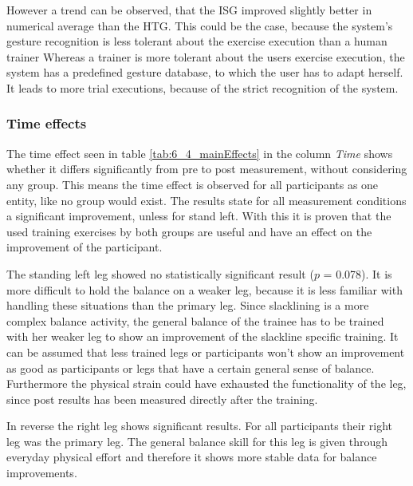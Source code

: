 However a trend can be observed, that the ISG improved slightly better in numerical average than the HTG.
This could be the case, because the system's gesture recognition is less tolerant about the exercise execution than a human trainer
Whereas a trainer is more tolerant about the users exercise execution, the system has a predefined gesture database, to which the user has to adapt herself.
It leads to more trial executions, because of the strict recognition of the system.

\subsubsection{Time effects}
The time effect seen in table \ref{tab:6_4_mainEffects} in the column \textit{Time} shows whether it differs significantly from pre to post measurement, without considering any group.
This means the time effect is observed for all participants as one entity, like no group would exist.
The results state for all measurement conditions a significant improvement, unless for stand left.
With this it is proven that the used training exercises by both groups are useful and have an effect on the improvement of the participant.

The standing left leg showed no statistically significant result ($p$ = 0.078).
It is more difficult to hold the balance on a weaker leg, because it is less familiar with handling these situations than the primary leg.
Since slacklining is a more complex balance activity, the general balance of the trainee has to be trained with her weaker leg to show an improvement of the slackline specific training.
It can be assumed that less trained legs or participants won't show an improvement as good as participants or legs that have a certain general sense of balance.
Furthermore the physical strain could have exhausted the functionality of the leg, since post results has been measured directly after the training.

In reverse the right leg shows significant results.
For all participants their right leg was the primary leg.
The general balance skill for this leg is given through everyday physical effort and therefore it shows more stable data for balance improvements.

